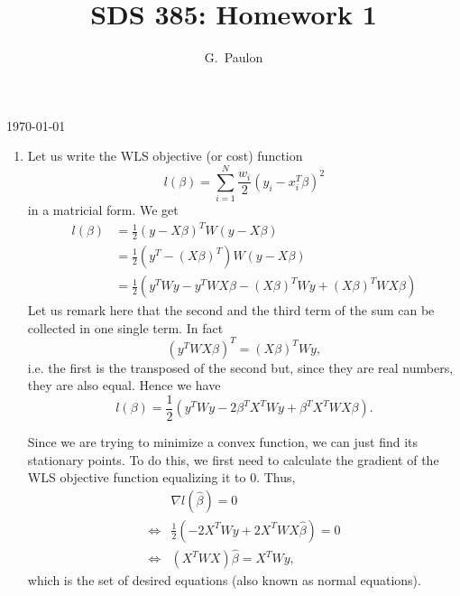 \documentclass{homework}
\title{SDS 385: Homework 1}
\author{G.~Paulon}
\begin{document}
\makeatletter
\begin{titlepage}
	\vspace*{\fill}
	\centering
	{\huge \@title \par}
	\vskip0.5cm
	{\large \@author \par}
	\vskip0.5cm
	{\large \today \par}
	\vspace*{\fill}
\end{titlepage}
\makeatother

\newpage 
\mbox{}
\thispagestyle{empty}
\newpage

\setcounter{page}{1}


\begin{enumerate}[label=(\Alph*)]
\item Let us write the WLS objective (or cost) function $$l (\beta) = \sum_{i=1}^N \frac{w_i}{2} (y_i - x_i^T \beta)^2$$ in a matricial form. We get 
\begin{align*}
l(\beta) &= \frac{1}{2} (y - X \beta)^T W (y - X \beta)
\\
&= \frac{1}{2} (y^T - (X \beta)^T) W (y - X \beta)
\\
&= \frac{1}{2} \left( y^T W y - y^T W X \beta - (X \beta)^T W y + (X \beta)^T W X \beta \right) 
\end{align*}
Let us remark here that the second and the third term of the sum can be collected in one single term. In fact 
$$(y^T W X \beta)^T = (X \beta)^T W y,$$ i.e. the first is the transposed of the second but, since they are real numbers, they are also equal. Hence we have
\begin{equation*}
l(\beta) = \frac{1}{2} \left( y^T W y - 2 \beta^T X^T W y + \beta^T X^T W X \beta \right). 
\end{equation*}

Since we are trying to minimize a convex function, we can just find its stationary points. To do this, we first need to calculate the gradient of the WLS objective function equalizing it to $0$. Thus, 
\begin{align*}
&\nabla l (\hat{\beta}) = 0
\\
\Leftrightarrow &\frac{1}{2} (- 2 X^T W y + 2 X^T W X \hat{\beta}) = 0
\\
\Leftrightarrow &(X^T W X) \hat{\beta} = X^T W y,
\end{align*}
which is the set of desired equations (also known as normal equations). 


\end{enumerate}
\end{document}
